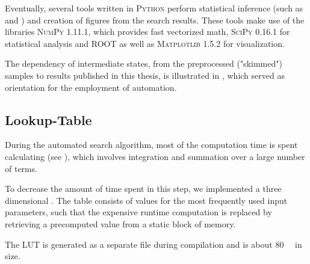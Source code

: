 Eventually, several tools written in \textsc{Python} perform statistical inference (such as \ptilde and \phat) and creation of figures from the search results. These tools make use of the libraries \textsc{NumPy} 1.11.1\cite{Walt:NumPyarraystructure}, which provides fast vectorized math, \textsc{SciPy} 0.16.1\cite{Jones:SciPyOpensource} for statistical analysis and \textsc{ROOT} as well as \textsc{Matplotlib} 1.5.2\cite{Hunter:Matplotlib2Dgraphics} for visualization.

The dependency of intermediate states, from the preprocessed ("skimmed") samples to results published in this thesis, is illustrated in , which served as orientation for the employment of automation.

\subsection{Lookup-Table}
During the automated search algorithm, most of the computation time is spent calculating \TS (see ), which involves integration and summation over a large number of terms.

To decrease the amount of time spent in this step, we implemented a three dimensional . The table consists of \TS values for the most frequently used input parameters, such that the expensive runtime computation is replaced by retrieving a precomputed value from a static block of memory.

The \ac{LUT} is generated as a separate file during compilation and is about \SI{80}{\mega\byte} in size.

